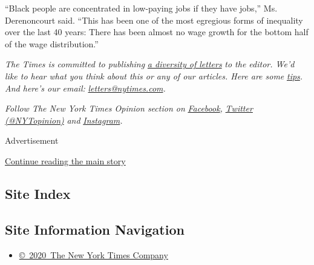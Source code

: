 ``Black people are concentrated in low-paying jobs if they have jobs,''
Ms. Derenoncourt said. ``This has been one of the most egregious forms
of inequality over the last 40 years: There has been almost no wage
growth for the bottom half of the wage distribution.''

\emph{The Times is committed to publishing}
\href{https://www.nytimes.com/2019/01/31/opinion/letters/letters-to-editor-new-york-times-women.html}{\emph{a
diversity of letters}} \emph{to the editor. We'd like to hear what you
think about this or any of our articles. Here are some}
\href{https://help.nytimes.com/hc/en-us/articles/115014925288-How-to-submit-a-letter-to-the-editor}{\emph{tips}}\emph{.
And here's our email:}
\href{mailto:letters@nytimes.com}{\emph{letters@nytimes.com}}\emph{.}

\emph{Follow The New York Times Opinion section on}
\href{https://www.facebook.com/nytopinion}{\emph{Facebook}}\emph{,}
\href{http://twitter.com/NYTOpinion}{\emph{Twitter (@NYTopinion)}}
\emph{and}
\href{https://www.instagram.com/nytopinion/}{\emph{Instagram}}\emph{.}

Advertisement

\protect\hyperlink{after-bottom}{Continue reading the main story}

\hypertarget{site-index}{%
\subsection{Site Index}\label{site-index}}

\hypertarget{site-information-navigation}{%
\subsection{Site Information
Navigation}\label{site-information-navigation}}

\begin{itemize}
\tightlist
\item
  \href{https://help.nytimes.com/hc/en-us/articles/115014792127-Copyright-notice}{©~2020~The
  New York Times Company}
\end{itemize}

